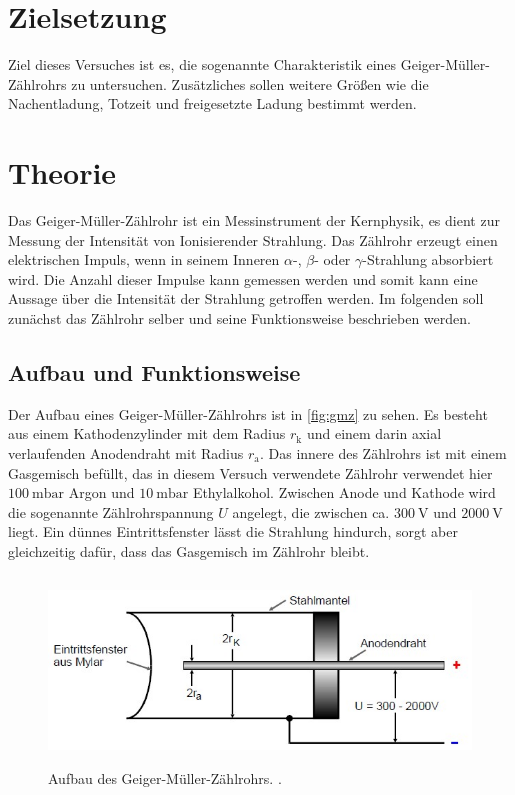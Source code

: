 \section{Zielsetzung}
Ziel dieses Versuches ist es, die sogenannte Charakteristik eines Geiger-Müller-Zählrohrs zu untersuchen.
Zusätzliches sollen weitere Größen wie die Nachentladung, Totzeit und freigesetzte Ladung
bestimmt werden.

\section{Theorie}
\label{sec:Theorie}
Das Geiger-Müller-Zählrohr ist ein Messinstrument der Kernphysik, es dient zur Messung der Intensität
von Ionisierender Strahlung. Das Zählrohr erzeugt einen elektrischen Impuls, wenn in seinem Inneren
$\alpha$-, $\beta$- oder $\gamma$-Strahlung absorbiert wird.
Die Anzahl dieser Impulse kann gemessen werden und somit kann eine Aussage über die Intensität der Strahlung
getroffen werden.
Im folgenden soll zunächst das Zählrohr selber und seine Funktionsweise beschrieben werden.

\subsection{Aufbau und Funktionsweise}

Der Aufbau eines Geiger-Müller-Zählrohrs ist in \autoref{fig:gmz} zu sehen.
Es besteht aus einem Kathodenzylinder mit dem Radius $r_\text{k}$ und einem darin axial verlaufenden
Anodendraht mit Radius $r_\text{a}$.
Das innere des Zählrohrs ist mit einem Gasgemisch befüllt, das in diesem Versuch verwendete Zählrohr
verwendet hier $\qty{100}{\milli\bar}$ Argon und $\qty{10}{\milli\bar}$ Ethylalkohol.
Zwischen Anode und Kathode wird die sogenannte Zählrohrspannung $U$ angelegt, die zwischen
ca. $\qty{300}{\volt}$ und $\qty{2000}{\volt}$ liegt.
Ein dünnes Eintrittsfenster lässt die Strahlung hindurch, sorgt aber gleichzeitig dafür, dass das
Gasgemisch im Zählrohr bleibt.

\begin{figure}[H]
    \centering
    \includegraphics[height=5cm]{content/pics/gmz.jpg}
    \caption{Aufbau des Geiger-Müller-Zählrohrs. \cite{v703}.}
    \label{fig:gmz}
\end{figure}

